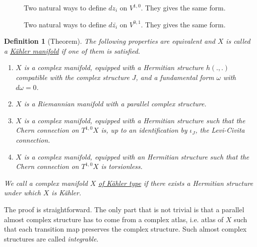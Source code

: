 \documentclass[11pt]{article}
\newtheorem{definition}{Definition}
\begin{document}
\begin{figure}
\centering
\label{fig:dz}
\caption{Two natural ways to define $dz_i$ on $V^{1,0}$. They gives the same form.}
\end{figure}

\begin{figure}
\centering
\label{fig:dzbar}
\caption{Two natural ways to define $d\bar{z_i}$ on $V^{0,1}$. They gives the same form.}
\end{figure}

\begin{definition}[Theorem]
The following properties are equivalent and \(X\) is called a \uline{Kähler manifold} if one of them is satisfied.
\begin{enumerate}
\item \(X\) is a complex manifold, equipped with a Hermitian structure \(h(.,.)\) compatible with the complex
structure \(J\), and a fundamental form \(\omega\)  with \(d\omega=0\).
\item \(X\) is a Riemannian manifold with a parallel complex structure.
\item \(X\) is a complex manifold, equipped with a Hermitian structure such that the Chern connection on
\(T^{1,0}X\) is, up to an identification by \(\iota_J\), the Levi-Civita connection.
\item \(X\) is a complex manifold, equipped with an Hermitian structure such that the Chern connection on
\(T^{1,0}X\) is torsionless.
\end{enumerate}
We call a complex manifold \(X\) \uline{of Kähler type} if there exists a Hermitian structure under which
\(X\) is Kähler.
\end{definition}
The proof is straightforward. The only part that is not trivial is that a parallel almost complex structure
has to come from a complex atlas, i.e. atlas of \(X\) such that each transition map preserves the
complex structure. Such almost complex structures are called \emph{integrable}.
\end{document}
